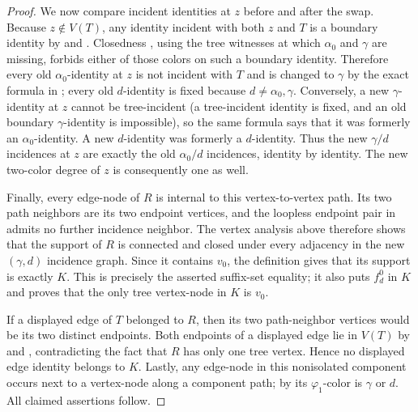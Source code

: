 \begin{proof}
We now compare incident identities at $z$ before and after the swap.
Because $z\notin V(T)$, any identity incident with both $z$ and $T$ is a
boundary identity by  and
.  Closedness
, using the tree witnesses at which
$\alpha_0$ and $\gamma$ are missing, forbids either of those colors on
such a boundary identity.  Therefore every old $\alpha_0$-identity at
$z$ is not incident with $T$ and is changed to $\gamma$ by the exact
formula in ; every old $d$-identity is
fixed because $d\ne\alpha_0,\gamma$.  Conversely, a new $\gamma$-identity
at $z$ cannot be tree-incident (a tree-incident identity is fixed, and an
old boundary $\gamma$-identity is impossible), so the same formula says
that it was formerly an $\alpha_0$-identity.  A new $d$-identity was
formerly a $d$-identity.  Thus the new $\gamma/d$ incidences at $z$ are
exactly the old $\alpha_0/d$ incidences, identity by identity.  The new
two-color degree of $z$ is consequently one as well.

Finally, every edge-node of $R$ is internal to this vertex-to-vertex
path.  Its two path neighbors are its two endpoint vertices, and the
loopless endpoint pair in  admits no further
incidence neighbor.  The vertex analysis above therefore shows that the
support of $R$ is connected and closed under every adjacency in the new
$(\gamma,d)$ incidence graph.
Since it contains $v_0$, the definition 
gives that its support is exactly $K$.  This is precisely the asserted
suffix-set equality; it also puts $f^0_d$ in $K$ and proves that the only
tree vertex-node in $K$ is $v_0$.

If a displayed edge of $T$ belonged to $R$, then its two path-neighbor
vertices would be its two distinct endpoints.  Both endpoints of a
displayed edge lie in $V(T)$ by  and
, contradicting the fact that $R$ has only
one tree vertex.  Hence no displayed edge identity belongs to $K$.
Lastly, any edge-node in this nonisolated component occurs next to a
vertex-node along a component path; by 
its $\varphi_1$-color is $\gamma$ or $d$.  All claimed assertions follow.
\end{proof}
